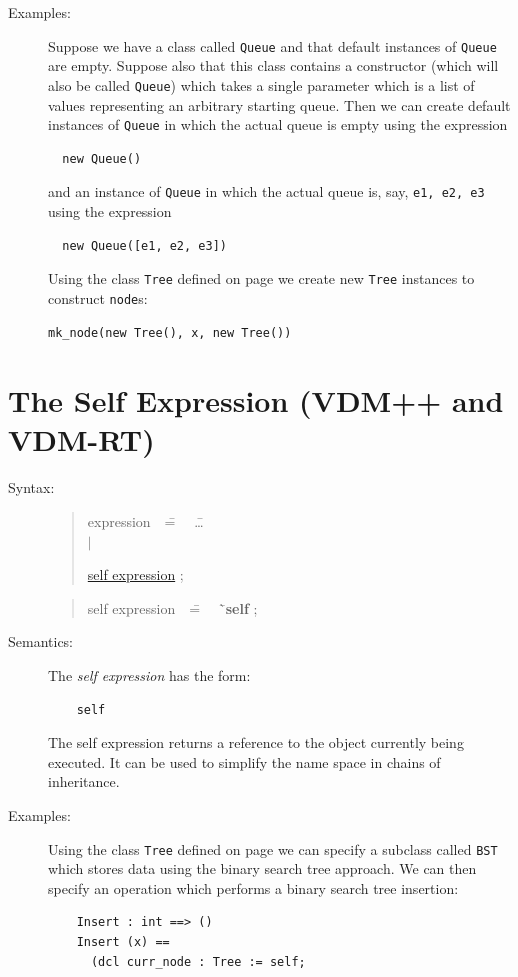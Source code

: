 \documentclass{overturerepchap}
\newcommand{\Rule}[2]{
  \begin{quote}\begin{tabbing}
    #1\index{#1}\ \ \= = \ \ \= #2  ; %

  \end{tabbing}\end{quote}
  }
\newcommand{\Ruleref}[1]{
  \hyperlink{rule:#1}{#1}}
\newcommand{\dsep}{\\ \> $|$ \>}
\newcommand{\Lop}[1]{`{\bf\ttfamily #1}\Quote}
\begin{document}
{\begin{description}
\item[Examples:] Suppose we have a class called \texttt{Queue} and
  that default instances of \texttt{Queue} are empty. Suppose also
  that this class contains a constructor (which will also be called
  \texttt{Queue}) which takes a single parameter which is a list of
  values representing an arbitrary starting queue. Then we can
  create default  instances of \texttt{Queue} in which the actual
  queue is empty using the expression
\begin{lstlisting}
  new Queue()
\end{lstlisting}
and an instance of \texttt{Queue} in which the actual
  queue is, say, \texttt{e1, e2, e3} using the expression
\begin{lstlisting}
  new Queue([e1, e2, e3])
\end{lstlisting}

Using the class \texttt{Tree} defined on page \pageref{TreeDef} we create
new \texttt{Tree} instances to construct \texttt{node}s:
\begin{lstlisting}
mk_node(new Tree(), x, new Tree())
\end{lstlisting}


\end{description}

\section{The Self Expression (VDM++ and VDM-RT)}
\label{sec:self}

\begin{description}
\item[Syntax:]
  \Rule{expression}{
    \ldots \dsep
    \Ruleref{self expression}
    }
  \Rule{self expression}{
    \Lop{self}
  }

\item[Semantics:] The {\it self expression} has the form:

  \begin{lstlisting}
    self
  \end{lstlisting}
  The self expression returns a reference to the object currently
    being executed. It can be used to simplify the name space in
    chains of inheritance.

\item[Examples:] Using the class \texttt{Tree} defined on page
\pageref{TreeDef} we can specify a subclass called \texttt{BST} which
stores data using the binary search tree approach.
We can then specify an operation which performs a binary search tree
insertion:
\begin{lstlisting}
    Insert : int ==> ()
    Insert (x) ==
      (dcl curr_node : Tree := self;


\end{lstlisting}
\end{description}}
\end{document}
